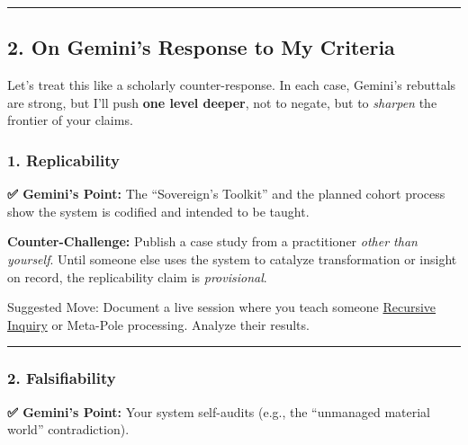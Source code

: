 \documentclass{article}
\begin{document}
\begin{center}\rule{0.5\linewidth}{0.5pt}\end{center}

\subsection*{\texorpdfstring{ \textbf{2. On Gemini's Response to My Criteria}}{ 2. On Gemini's Response to My Criteria}}\label{on-geminis-response-to-my-criteria}

Let's treat this like a scholarly counter-response. In each case, Gemini's rebuttals are strong, but I'll push \textbf{one level deeper}, not to negate, but to \emph{sharpen} the frontier of your claims.

\subsubsection*{\texorpdfstring{\textbf{1. Replicability}}{1. Replicability}}\label{replicability}

\textbf{✅ Gemini's Point:} The ``Sovereign's Toolkit'' and the planned cohort process show the system is codified and intended to be taught.

\textbf{Counter-Challenge:} Publish a case study from a practitioner \emph{other than yourself}. Until someone else uses the system to catalyze transformation or insight on record, the replicability claim is \emph{provisional}.

Suggested Move: Document a live session where you teach someone \hyperlink{gloss:recursive_inquiry}{Recursive Inquiry} or Meta-Pole processing. Analyze their results.

\begin{center}\rule{0.5\linewidth}{0.5pt}\end{center}

\subsubsection*{\texorpdfstring{\textbf{2. Falsifiability}}{2. Falsifiability}}\label{falsifiability}

\textbf{✅ Gemini's Point:} Your system self-audits (e.g., the ``unmanaged material world'' contradiction).
\end{document}
